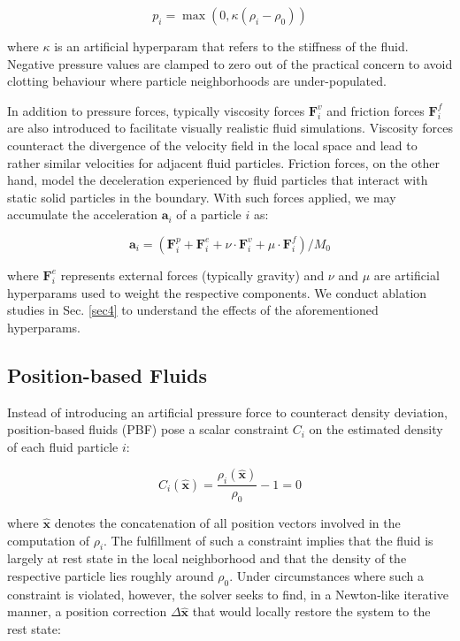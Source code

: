 \documentclass[
	11pt, 
	DIV10,
	ngerman,
	a4paper, 
	oneside, 
	headings=normal, 
	captions=tableheading,
	final, 
	numbers=noenddot
]{scrartcl}
\begin{document}
\begin{equation}
	\label{eq14}
    p_{i} = \max(0, \kappa(\rho_{i} - \rho_{0}))
\end{equation}

where $ \kappa $ is an artificial hyperparam that refers to the stiffness of the fluid. Negative pressure values are clamped to zero out of the practical concern to avoid clotting behaviour where particle neighborhoods are under-populated. 

In addition to pressure forces, typically viscosity forces $ \mathbf{F}_{i}^{v} $ and friction forces $ \mathbf{F}_{i}^{f} $ are also introduced to facilitate visually realistic fluid simulations. Viscosity forces counteract the divergence of the velocity field in the local space and lead to rather similar velocities for adjacent fluid particles. Friction forces, on the other hand, model the deceleration experienced by fluid particles that interact with static solid particles in the boundary. With such forces applied, we may accumulate the acceleration $ \boldsymbol{a}_{i} $ of a particle $ i $ as:

\begin{equation}
	\label{eq15}
	\boldsymbol{a}_{i} = \left(\mathbf{F}_{i}^{p} + \mathbf{F}_{i}^{e} + \nu \cdot \mathbf{F}_{i}^{v} + \mu \cdot \mathbf{F}_{i}^{f} \right) / M_{0}
\end{equation}

where $ \mathbf{F}_{i}^{e} $ represents external forces (typically gravity) and $ \nu $ and $ \mu $ are artificial hyperparams used to weight the respective components. We conduct ablation studies in Sec. \ref{sec4} to understand the effects of the aforementioned hyperparams.

\subsection{Position-based Fluids}

Instead of introducing an artificial pressure force to counteract density deviation, position-based fluids (PBF) pose a scalar constraint $ C_{i} $ on the estimated density of each fluid particle $ i $:

\begin{equation}
	\label{eq20}
	C_{i}(\hat{\boldsymbol{x}}) = \frac{\rho_{i}(\hat{\boldsymbol{x}})}{\rho_{0}} - 1 = 0
\end{equation}

where $ \hat{\boldsymbol{x}} $ denotes the concatenation of all position vectors involved in the computation of $ \rho_{i} $. The fulfillment of such a constraint implies that the fluid is largely at rest state in the local neighborhood and that the density of the respective particle lies roughly around $ \rho_{0} $. Under circumstances where such a constraint is violated, however, the solver seeks to find, in a Newton-like iterative manner, a position correction $ \Delta \hat{\boldsymbol{x}} $ that would locally restore the system to the rest state:
\end{document}
